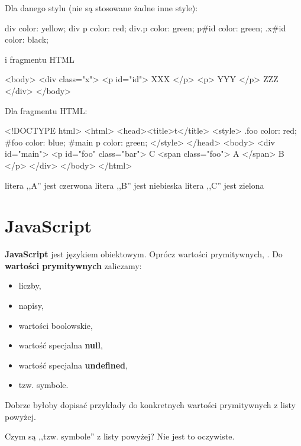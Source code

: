 \begin{problems}
    \prob Dla danego stylu (nie są stosowane żadne inne style):
    \begin{css}
        div {color: yellow;}
        div p {color: red;}
        div.p {color: green;}
        p#id {color: green;}
        .x#id {color: black;}
    \end{css}
    i fragmentu HTML
    \begin{html}
        <body>
            <div class="x">
                <p id="id"> XXX </p>
                <p> YYY </p>
                ZZZ
            </div>
        </body>
    \end{html}

    \prob Dla fragmentu HTML:
    \begin{html}
        <!DOCTYPE html>
        <html>
        <head><title>t</title>
        <style>
            .foo {color: red;}
            #foo {color: blue;}
            #main p {color: green;}
        </style>
        </head>
        <body>
            <div id="main">
                <p id="foo" class="bar">
                    C
                    <span class="foo"> A </span>
                    B
                </p>
            </div>
        </body>
        </html>
    \end{html}
    \answers
    {litera ,,A'' jest czerwona}
    {litera ,,B'' jest niebieska}
    {litera ,,C'' jest zielona}
\end{problems}

\section{JavaScript}
\textbf{JavaScript} jest językiem obiektowym. Oprócz wartości prymitywnych, . Do \textbf{wartości prymitywnych} zaliczamy:
\begin{itemize}
    \item liczby,
    \item napisy,
    \item wartości boolowskie,
    \item wartość specjalna \textbf{null},
    \item wartość specjalna \textbf{undefined},
    \item tzw. symbole.
\end{itemize}

\begin{editorsnote}
    Dobrze byłoby dopisać przykłady do konkretnych wartości prymitywnych z listy powyżej.

    Czym są ,,tzw. symbole'' z listy powyżej? Nie jest to oczywiste.
\end{editorsnote}

